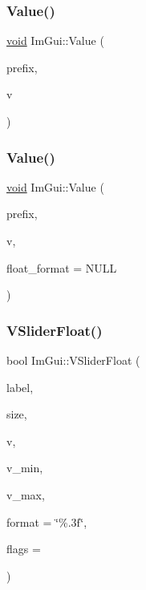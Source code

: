 \mbox{\label{namespaceImGui_aec80a3e35bf7c1ff5704334e5a3ebd5a}} 
\subsubsection{\texorpdfstring{Value()}{Value()}\hspace{0.1cm}{\footnotesize\ttfamily [3/4]}}
{\footnotesize\ttfamily \hyperlink{imgui__impl__opengl3__loader_8h_ac668e7cffd9e2e9cfee428b9b2f34fa7}{void} Im\+Gui\+::\+Value (\begin{DoxyParamCaption}\item[{const char $\ast$}]{prefix,  }\item[{unsigned int}]{v }\end{DoxyParamCaption})}

\mbox{\label{namespaceImGui_a0c8b87438082a1d0a46ae2a76090ca16}} 
\subsubsection{\texorpdfstring{Value()}{Value()}\hspace{0.1cm}{\footnotesize\ttfamily [4/4]}}
{\footnotesize\ttfamily \hyperlink{imgui__impl__opengl3__loader_8h_ac668e7cffd9e2e9cfee428b9b2f34fa7}{void} Im\+Gui\+::\+Value (\begin{DoxyParamCaption}\item[{const char $\ast$}]{prefix,  }\item[{float}]{v,  }\item[{const char $\ast$}]{float\+\_\+format = {\ttfamily NULL} }\end{DoxyParamCaption})}

\mbox{\label{namespaceImGui_a990332e589b828093786bbc007b9bfda}} 
\subsubsection{\texorpdfstring{V\+Slider\+Float()}{VSliderFloat()}}
{\footnotesize\ttfamily bool Im\+Gui\+::\+V\+Slider\+Float (\begin{DoxyParamCaption}\item[{const char $\ast$}]{label,  }\item[{const \hyperlink{structImVec2}{Im\+Vec2} \&}]{size,  }\item[{float $\ast$}]{v,  }\item[{float}]{v\+\_\+min,  }\item[{float}]{v\+\_\+max,  }\item[{const char $\ast$}]{format = {\ttfamily \char`\"{}\%.3f\char`\"{}},  }\item[{Im\+Gui\+Slider\+Flags}]{flags = {} }\end{DoxyParamCaption})}

